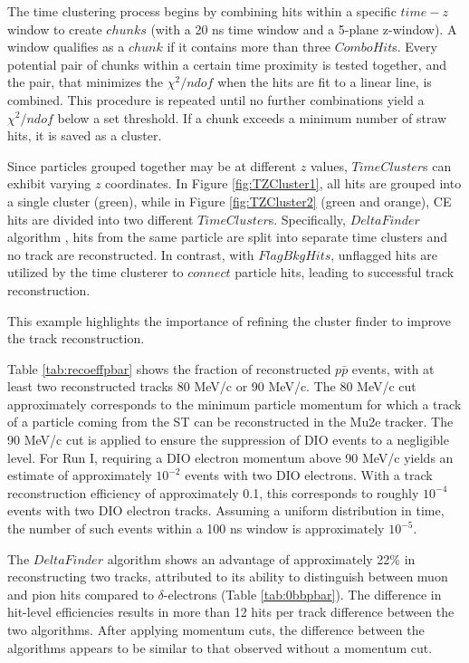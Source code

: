 The time clustering process begins 
by combining hits within a specific $time-z$ 
window to create $chunks$ (with a 
20 ns time window and a 5-plane z-window). 
A window qualifies as a $chunk$ if 
it contains more than three $ComboHit$s. 
Every potential pair of chunks 
within a certain time 
proximity is tested together, 
and the pair, that minimizes 
the $\chi^2/ndof$ when the hits 
are fit to a linear line, 
is combined. This procedure is 
repeated until no further combinations 
yield a $\chi^2/ndof$ below a set 
threshold. If a chunk 
exceeds a minimum number of straw 
hits, it is saved as a cluster.

Since particles grouped together 
may be at different $z$ values, 
$TimeCluster$s can exhibit varying 
$z$ coordinates. In Figure \ref{fig:TZCluster1}, 
all hits are grouped into a single cluster (green), 
while in Figure \ref{fig:TZCluster2} 
(green and orange), CE hits are divided into 
two different $TimeCluster$s.  
Specifically,  $DeltaFinder$ algorithm ,
hits from the same 
particle are  split into separate time clusters and no 
track are reconstructed. In contrast, 
with $FlagBkgHits$, unflagged hits are utilized by the 
time clusterer to $connect$ particle hits, 
leading to successful track reconstruction. 

This example highlights the importance of refining 
the  cluster finder to improve the track reconstruction.


Table \ref{tab:recoeffpbar} shows the fraction of reconstructed $p\bar{p}$ events, 
with at least two reconstructed tracks 
 80 MeV/c or 90 MeV/c. The 80 
MeV/c cut approximately corresponds to the minimum particle momentum for which 
a track of a particle coming from the ST can be reconstructed 
in the Mu2e tracker. The 90 MeV/c cut is applied to ensure the 
suppression of DIO events to a negligible level. 
For Run I, requiring a DIO electron momentum above 90 MeV/c 
yields an estimate of approximately $10^{-2}$ events with 
two DIO electrons. With a track reconstruction efficiency of 
approximately 0.1, this corresponds to roughly $10^{-4}$ events with two 
 DIO electron tracks.
Assuming a uniform distribution in time, the number of such events
within a 100 ns window is approximately $10^{-5}$.

The $DeltaFinder$ algorithm shows an advantage of 
approximately 22\% in reconstructing 
two tracks, attributed to its ability to distinguish between 
muon and pion hits compared to $\delta$-electrons (Table \ref{tab:0bbpbar}). 
The difference in hit-level efficiencies results in more 
than 12 hits per track difference between the two algorithms. After 
applying momentum cuts, the difference between the algorithms 
appears to be similar to that observed without a momentum cut.


